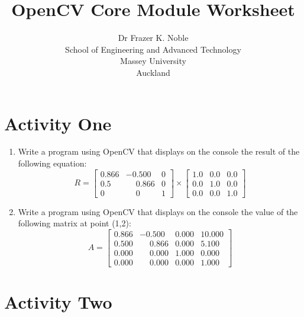 \documentclass[12pt, A4]{article}
\title{OpenCV Core Module Worksheet}
\author{Dr Frazer K. Noble\\[0.25cm]
    School of Engineering and Advanced Technology\\
    Massey University\\
    Auckland}
\date{}
\begin{document}
\maketitle

\section*{Activity One}

\begin{enumerate}[label=(\alph*)]

    \item Write a program using OpenCV that displays on the console the result of the following equation:
    \begin{equation*}
        R = 
        \begin{bmatrix}
            0.866 & -0.500 & 0\\
            0.5 & \phantom{-}0.866 & 0\\
            0 & \phantom{-}0 & 1
        \end{bmatrix}
        \times
        \begin{bmatrix}
            1.0 & 0.0 & 0.0\\
            0.0 & 1.0 & 0.0\\
            0.0 & 0.0 & 1.0
        \end{bmatrix}
    \end{equation*}

    \item Write a program using OpenCV that displays on the console the value of the following matrix at point (1,2):
    \begin{equation*}
        A =
        \begin{bmatrix}
            0.866 & -0.500 & 0.000 & 10.000\\
            0.500 & \phantom{-}0.866 & 0.000 & 5.100\\
            0.000 & \phantom{-}0.000 & 1.000 & 0.000\\
            0.000 & \phantom{-}0.000 & 0.000 & 1.000
        \end{bmatrix}
    \end{equation*}

\end{enumerate}


\section*{Activity Two}
\end{document}
